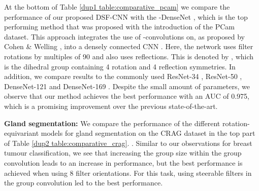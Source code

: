 \documentclass[journal]{IEEEtran}
\newcommand\mg[1]{{\color{black}{#1}}}
\begin{document}
	    At the bottom of Table \ref{dup1 table:comparative_pcam} we compare the performance of our proposed DSF-CNN with the -DenseNet \cite{veeling2018rotation}, which is the top performing method that was proposed with the introduction of the PCam dataset. This approach integrates the use of -convolutions on, as proposed by Cohen \& Welling \cite{cohen2016group}, into a densely connected CNN \cite{densenet}. Here, the network uses filter rotations by multiples of 90 and also uses reflections. This is denoted by , which is the dihedral group containing 4 rotation and 4 reflection symmetries. In addition, we compare results to the commonly used ResNet-34 \cite{he2016deep}, ResNet-50 \cite{he2016deep}, DenseNet-121 \cite{densenet} and DenseNet-169 \cite{densenet}. Despite the small amount of parameters, we observe that our method achieves the best performance with an AUC of 0.975, which is a promising improvement over the previous state-of-the-art.
	    
	    \textbf{Gland segmentation: }We compare the performance of the different rotation-equivariant models for gland segmentation on the CRAG dataset in the top part of Table \ref{dup2 table:comparative_crag}. \mg{For this experiment, when comparing different rotation-equivariant approaches, we choose to only assess the performance of conventional CNNs, standard -CNNs and steerable -CNNs. This is because our previous experiment on breast tumour classification indicates that -CNNs are capable of achieving a superior result over competing rotation-equivariant approaches}. Similar to our observations for breast tumour classification, we see that increasing the group size within the group convolution leads to an increase in performance, but the best performance is achieved when using 8 filter orientations. For this task, using steerable filters in the group convolution led to the best performance.  
	    
\end{document}
